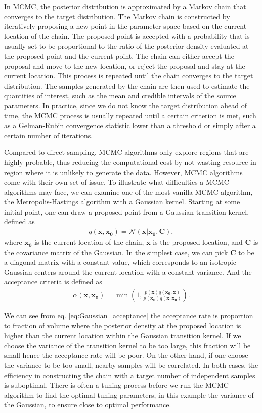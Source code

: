 \documentclass[twocolumn]{aastex631}
\begin{document}
In MCMC, the posterior distribution is approximated by a Markov chain that
converges to the target distribution. The Markov chain is constructed by
iteratively proposing a new point in the parameter space based on the current
location of the chain. The proposed point is accepted with a probability that is
usually set to be proportional to the ratio of the posterior density evaluated
at the proposed point and the current point. The chain can either accept the
proposal and move to the new location, or reject the proposal and stay at the
current location. This process is repeated until the chain converges to the
target distribution. The samples generated by the chain are then used to
estimate the quantities of interest, such as the mean and credible intervals of
the source parameters. In practice, since we do not know the target distribution
ahead of time, the MCMC process is usually repeated until a certain criterion is
met, such as a Gelman-Rubin convergence statistic \cite{Gelman-rhat} lower than
a threshold or simply after a certain number of iterations.

Compared to direct sampling, MCMC algorithms only explore regions that are
highly probable, thus reducing the computational cost by not wasting resource in
region where it is unlikely to generate the data. However, MCMC algorithms come
with their own set of issue. To illustrate what difficulties a MCMC algorithms
may face, we can examine one of the most vanilla MCMC algorithm, the
Metropolis-Hastings algorithm with a Gaussian kernel. Starting at some initial
point, one can draw a proposed point from a Gaussian transition kernel, defined
as
\begin{align}
    q(\mathbf{x},\mathbf{x_0})= \mathcal{N}(\mathbf{x}|\mathbf{x_0},\mathbf{C}),
\end{align}
where $\mathbf{x_0}$ is the current location of the chain,
$\mathbf{x}$ is the proposed location, and $\mathbf{C}$ is the
covariance matrix of the Gaussian. In the simplest case, we can pick
$\mathbf{C}$ to be a diagonal matrix with a constant value, which corresponds to
an isotropic Gaussian centers around the current location with a constant variance.
And the acceptance criteria is defined as
\begin{align}
\alpha(\mathbf{x},\mathbf{x_0}) = \min\left(1,\frac{p(\mathbf{x})q(\mathbf{x_0},\mathbf{x})}{p(\mathbf{x_0})q(\mathbf{x},\mathbf{x_0})}\right).
\label{eq:Gaussian_acceptance}
\end{align}

We can see from eq. \ref{eq:Gaussian_acceptance} the acceptance rate is
proportion to fraction of volume where the posterior density at the proposed
location is higher than the current location within the Gaussian transition
kernel. If we choose the variance of the transition kernel to be too large, this
fraction will be small hence the acceptance rate will be poor. On the other
hand, if one choose the variance to be too small, nearby samples will be
correlated. In both cases, the efficiency in constructing the chain with a
target number of independent samples is suboptimal. There is often a tuning
process before we run the MCMC algorithm to find the optimal tuning parameters,
in this example the variance of the Gaussian, to ensure close to optimal
performance.
\end{document}
